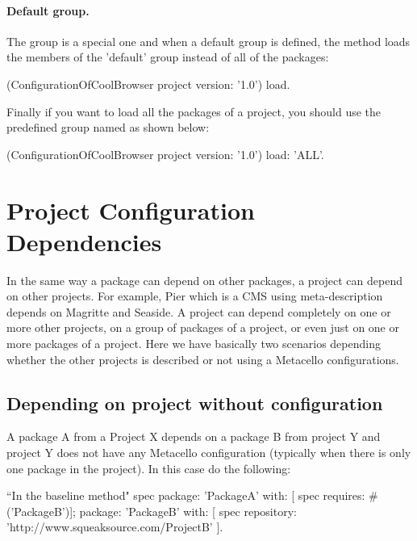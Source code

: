 \documentclass[a4paper,10pt,twoside]{book}
\begin{document}
\paragraph{Default group.} The  group is a special one and when a default group is defined, the  method loads the members of the 'default' group instead of all of the packages:
   
\begin{code}{}
(ConfigurationOfCoolBrowser project version: '1.0') load.
\end{code}

Finally if you want to load all the packages of a project, you should use the predefined group named  as shown below: 

\begin{code}{}
(ConfigurationOfCoolBrowser project version: '1.0') load: 'ALL'.
\end{code}
 

\section{Project Configuration Dependencies}

In the same way a package can depend on other packages, a project can depend on other projects.  For example, Pier which is a CMS using meta-description depends on Magritte and Seaside.  A project can depend completely on one or more other projects, on a group of packages of a project, or even just on one or more packages of a project. Here we have basically two scenarios depending whether the other projects is described or not using a Metacello configurations. 

\subsection{Depending on project without configuration}

A package A from a Project X depends on a package B from project Y and project Y does not have any Metacello configuration (typically when there is only one package in the project). In this case do the following:
\begin{code}{}
		``In the baseline method"
		spec 
			package: 'PackageA' with: [  spec requires: #('PackageB')];
			package: 'PackageB' with: [  spec repository: 'http://www.squeaksource.com/ProjectB' ].	
\end{code}
\end{document}
